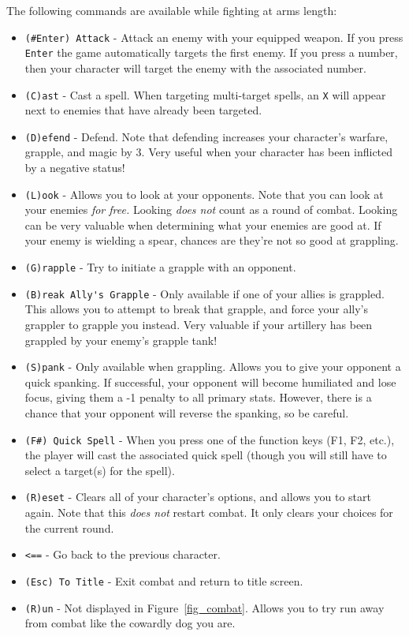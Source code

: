 \documentclass{report}
\begin{document}
The following commands are available while fighting at arms length:
\begin{itemize}
    \item \verb|(#Enter) Attack| - Attack an enemy with your equipped weapon. If you press \verb|Enter| the game automatically targets the first enemy. If you press a number, then your character
        will target the enemy with the associated number.
    \item \verb|(C)ast| - Cast a spell. When targeting multi-target spells, an \verb|X| will appear next to enemies that have
    already been targeted.
    \item \verb|(D)efend| - Defend. Note that defending increases your character's
    warfare, grapple, and magic by 3. Very useful when your character has been
    inflicted by a negative status!
    \item \verb|(L)ook| - Allows you to look at your opponents. Note that you can
    look at your enemies \emph{for free.} Looking \emph{does not} count as a round
    of combat. Looking can be very valuable when determining what your enemies are
    good at. If your enemy is wielding a spear, chances are they're not so good
    at grappling.
    \item \verb|(G)rapple| - Try to initiate a grapple with an opponent.
    \item \verb|(B)reak Ally's Grapple| - Only available if one of your allies is grappled.
    This allows you to attempt to break that grapple, and force your ally's grappler
    to grapple you instead. Very valuable if your artillery has been 
    grappled by your enemy's grapple tank!
    \item \verb|(S)pank| - Only available when grappling. Allows you to give your opponent a quick spanking. If successful, your opponent will become humiliated and lose focus, giving them a -1 
        penalty to all primary stats. However, there is a chance that your opponent will reverse the spanking, so be careful.
    \item \verb|(F#) Quick Spell| - When you press one of the function keys (F1, F2, etc.), the player will cast the associated quick spell (though you will still have to select a target(s) for the spell).
    \item \verb|(R)eset| - Clears all of your character's options, and allows you
    to start again. Note that this \emph{does not} restart combat. It only 
    clears your choices for the current round.
    \item {\color{green!50!black} \texttt{<==}} - Go back to the previous 
        character.
    \item \verb|(Esc) To Title| - Exit combat and return to title screen.
    \item \verb|(R)un| - Not displayed in Figure~\ref{fig_combat}. Allows you
        to try run away from combat like the cowardly dog you are.
\end{itemize}
\end{document}
